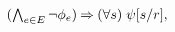 \begin{minipage}{1.0\linewidth}
\begin{minipage}[t]{.45\textwidth}
\begin{enumerate}[topsep=0pt,label=(\textsc{r}\arabic*),ref=\textsc{r}\arabic*]
\begin{math}
\begin{aligned}[t]
          \textstyle (\bigwedge_{e\in E}\lnot\phi_e)
          \mathbin{\Rightarrow} 
          (\forall s)\;
          \psi[s/r],
        \end{aligned}
      \end{math}
  \end{enumerate}
\end{minipage}
\begin{minipage}[t]{.55\textwidth}
  \begin{enumerate}[resume,topsep=0pt,label=(\textsc{r}\arabic*),ref=\textsc{r}\arabic*]

\end{enumerate}
\end{minipage}
\end{minipage}
